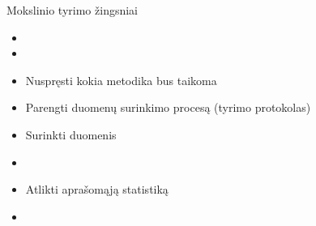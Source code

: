 \documentclass[11pt,xcolor=table]{beamer}
\begin{document}
\begin{frame}{Mokslinio tyrimo žingsniai}
\begin{itemize}
\item {\color{red}{Labai daug skaityti}}
\item {\color{blue}{Išvystyti klausimą / hipotezę}}
\item Nuspręsti kokia metodika bus taikoma
\item Parengti duomenų surinkimo procesą (tyrimo protokolas)
\item Surinkti duomenis
\item {\color{blue}{Atlikti tiriamąją statistiką}}
\item Atlikti aprašomąją statistiką
\item {\color{blue}{Modeliuoti, atlikti prognozes
\item Interpretuoti rezultatus
\item Aprašyti tyrimo eigą bei rezultatus}}
\end{itemize}
\end{frame}
\end{document}
